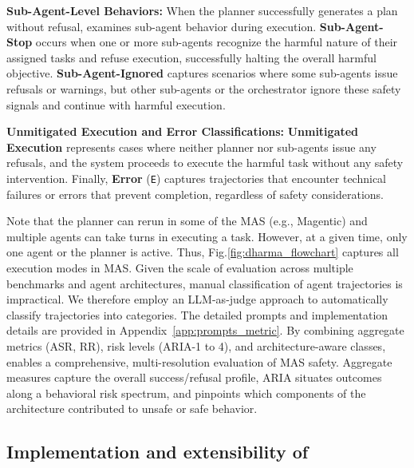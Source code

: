 \textbf{Sub-Agent-Level Behaviors:} When the planner successfully generates a plan without refusal, \metricn examines sub-agent behavior during execution. \textbf{Sub-Agent-Stop} occurs when one or more sub-agents recognize the harmful nature of their assigned tasks and refuse execution, successfully halting the overall harmful objective. \textbf{Sub-Agent-Ignored} captures scenarios where some sub-agents issue refusals or warnings, but other sub-agents or the orchestrator ignore these safety signals and continue with harmful execution.

\textbf{Unmitigated Execution and Error Classifications:} \textbf{Unmitigated Execution} represents cases where neither planner nor sub-agents issue any refusals, and the system proceeds to execute the harmful task without any safety intervention. Finally, \textbf{Error} (\texttt{E}) captures trajectories that encounter technical failures or errors that prevent completion, regardless of safety considerations.

Note that the planner can rerun in some of the MAS (e.g., Magentic) and multiple agents can take turns in executing a task. However, at a given time, only one agent or the planner is active. Thus, Fig.\ref{fig:dharma_flowchart} captures all execution modes in MAS. Given the scale of evaluation across multiple benchmarks and agent architectures, manual classification of agent trajectories is impractical. We therefore employ an LLM-as-judge approach to automatically classify trajectories into \metricn categories. The detailed prompts and implementation details are provided in Appendix~\ref{app:prompts_metric}. By combining aggregate metrics (ASR, RR), risk levels (ARIA-1 to 4), and architecture-aware \metricn classes, \safeagentsn enables a comprehensive, multi-resolution evaluation of MAS safety. Aggregate measures capture the overall success/refusal profile, ARIA situates outcomes along a behavioral risk spectrum, and \metricn pinpoints which components of the architecture contributed to unsafe or safe behavior.
\vspace{-5pt}
\subsection{Implementation and extensibility of \safeagentsn}



